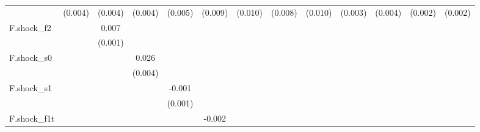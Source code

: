 {\begin{tabular}{l*{12}{c}}
            &     (0.004)         &     (0.004)         &     (0.004)         &     (0.005)         &     (0.009)         &     (0.010)         &     (0.008)         &     (0.010)         &     (0.003)         &     (0.004)         &     (0.002)         &     (0.002)         \\
\addlinespace
F.shock\_f2  &                     &       0.007\sym{***}&                     &                     &                     &                     &                     &                     &                     &                     &                     &                     \\
            &                     &     (0.001)         &                     &                     &                     &                     &                     &                     &                     &                     &                     &                     \\
\addlinespace
F.shock\_s0  &                     &                     &       0.026\sym{***}&                     &                     &                     &                     &                     &                     &                     &                     &                     \\
            &                     &                     &     (0.004)         &                     &                     &                     &                     &                     &                     &                     &                     &                     \\
\addlinespace
F.shock\_s1  &                     &                     &                     &      -0.001         &                     &                     &                     &                     &                     &                     &                     &                     \\
            &                     &                     &                     &     (0.001)         &                     &                     &                     &                     &                     &                     &                     &                     \\
\addlinespace
F.shock\_f1t &                     &                     &                     &                     &      -0.002         &                     &                     &                     &                     &                     &                     &                     \\

\end{tabular}}
